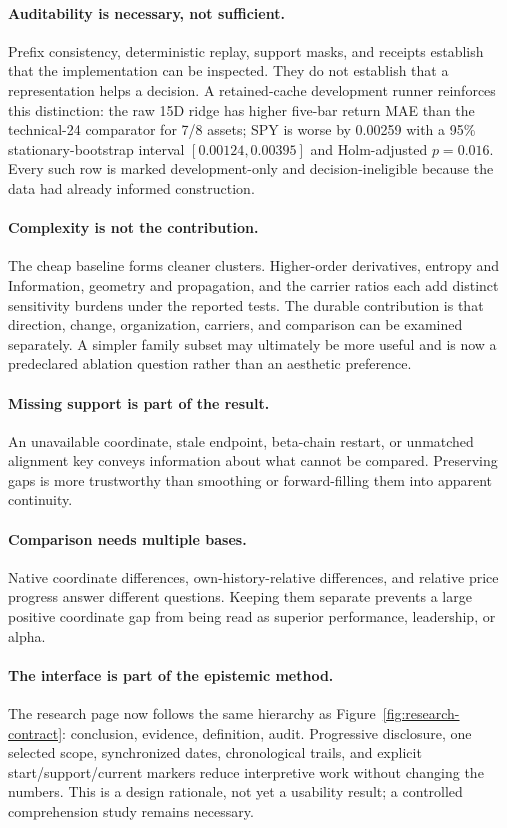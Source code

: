 \documentclass{article}
\begin{document}
\paragraph{Auditability is necessary, not sufficient.}
Prefix consistency, deterministic replay, support masks, and receipts establish that the implementation can be inspected. They do not establish that a representation helps a decision. A retained-cache development runner reinforces this distinction: the raw 15D ridge has higher five-bar return MAE than the technical-24 comparator for 7/8 assets; SPY is worse by 0.00259 with a 95\% stationary-bootstrap interval $[0.00124,0.00395]$ and Holm-adjusted $p=0.016$. Every such row is marked development-only and decision-ineligible because the data had already informed construction.

\paragraph{Complexity is not the contribution.}
The cheap baseline forms cleaner clusters. Higher-order derivatives, entropy and Information, geometry and propagation, and the carrier ratios each add distinct sensitivity burdens under the reported tests. The durable contribution is that direction, change, organization, carriers, and comparison can be examined separately. A simpler family subset may ultimately be more useful and is now a predeclared ablation question rather than an aesthetic preference.

\paragraph{Missing support is part of the result.}
An unavailable coordinate, stale endpoint, beta-chain restart, or unmatched alignment key conveys information about what cannot be compared. Preserving gaps is more trustworthy than smoothing or forward-filling them into apparent continuity.

\paragraph{Comparison needs multiple bases.}
Native coordinate differences, own-history-relative differences, and relative price progress answer different questions. Keeping them separate prevents a large positive coordinate gap from being read as superior performance, leadership, or alpha.

\paragraph{The interface is part of the epistemic method.}
The research page now follows the same hierarchy as Figure~\ref{fig:research-contract}: conclusion, evidence, definition, audit. Progressive disclosure, one selected scope, synchronized dates, chronological trails, and explicit start/support/current markers reduce interpretive work without changing the numbers. This is a design rationale, not yet a usability result; a controlled comprehension study remains necessary.
\end{document}
